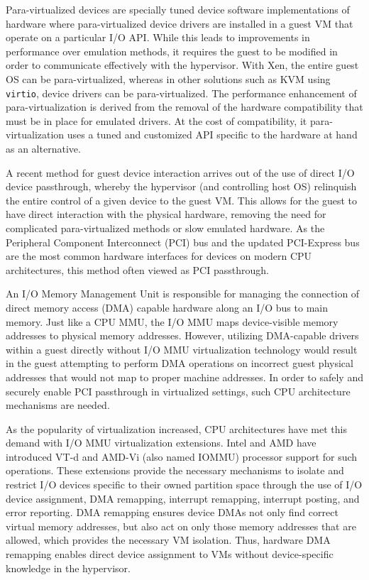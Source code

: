 Para-virtualized devices are specially tuned device software implementations of hardware where para-virtualized device drivers are installed in a guest VM that operate on a particular I/O API.  While this leads to improvements in performance over emulation methods, it requires the guest to be modified in order to communicate effectively with the hypervisor. With Xen, the entire guest OS can be para-virtualized, whereas in other solutions such as KVM using \verb|virtio|, device drivers can be para-virtualized. The performance enhancement of para-virtualization is derived from the removal of the hardware compatibility that must be in place for emulated drivers. At the cost of compatibility, it para-virtualization uses a tuned and customized API specific to the hardware at hand as an alternative.


A recent method for guest device interaction arrives out of the use of direct I/O device passthrough, whereby the hypervisor (and controlling host OS) relinquish the entire control of a given device to the guest VM.  This allows for the guest to have direct interaction with the physical hardware, removing the need for complicated para-virtualized methods or slow emulated hardware.  As the Peripheral Component Interconnect (PCI) bus and the updated PCI-Express bus are the most common hardware interfaces for devices on modern CPU architectures, this method often viewed as PCI passthrough.  

An I/O Memory Management Unit  is responsible for managing the connection of direct memory access (DMA) capable hardware along an I/O bus to main memory. Just like a CPU MMU, the I/O MMU maps device-visible memory addresses to physical memory addresses. However, utilizing DMA-capable drivers within a guest directly without I/O MMU virtualization technology would result in the guest attempting to perform DMA operations on incorrect guest physical addresses that would not map to proper machine addresses. In order to safely and securely enable PCI passthrough in virtualized settings, such CPU architecture mechanisms are needed. 

As the popularity of virtualization increased, CPU architectures have met this demand with I/O MMU virtualization extensions. Intel and AMD have introduced VT-d and AMD-Vi (also named IOMMU) processor support for such operations.  These extensions provide the necessary mechanisms to isolate and restrict I/O devices specific to their owned partition space \cite{abramson2006vtd} through the use of I/O device assignment, DMA remapping, interrupt remapping, interrupt posting, and error reporting. DMA remapping ensures device DMAs not only find correct virtual memory addresses, but also act on only those memory addresses that are allowed, which provides the necessary VM isolation. Thus, hardware DMA remapping enables direct device assignment to VMs without device-specific knowledge in the hypervisor. 

